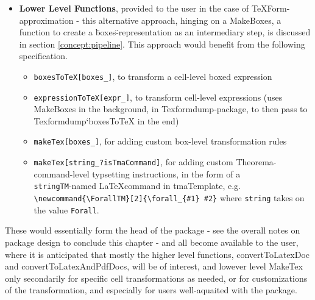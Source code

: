 \begin{itemize}
    \item \textbf{Lower Level Functions}, provided to the user in the case of TeXForm-approximation - this alternative approach, hinging on a MakeBoxes, a function to create a \"boxes\"-representation as an intermediary step, is discussed in section \ref{concept:pipeline}. This approach would benefit from the following specification.
    \begin{itemize}
        \item \texttt{boxesToTeX[boxes\_]}, to transform a cell-level boxed expression
        \item \texttt{expressionToTeX[expr\_]}, to transform cell-level expressions (uses MakeBoxes \cite{wolfram_research_inc_makeboxeswolfram_nodate} in the background, in Texformdump-package, to then pass to Texformdump`boxesToTeX in the end) 
        \item \texttt{makeTex[boxes\_]}, for adding custom box-level transformation rules
        \item \texttt{makeTex[string\_?isTmaCommand]}, for adding custom Theorema-command-level typsetting instructions, in the form of a \texttt{\\stringTM}-named \LaTeX command in tmaTemplate, e.g. \verb|\newcommand{\ForallTM}[2]{\forall_{#1} #2}| where \texttt{string} takes on the value \texttt{Forall}.
    \end{itemize}

\end{itemize}

These would essentially form the head of the package - see the overall notes on package design to conclude this chapter - and all become available to the user, where it is anticipated that mostly the higher level functions, convertToLatexDoc and convertToLatexAndPdfDocs, will be of interest, and lowever level MakeTex only secondarily for specific cell transformations as needed, or for customizations of the transformation, and especially for users well-aquaited with the package.

